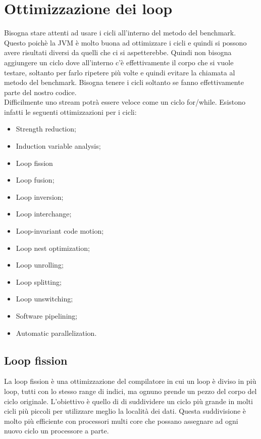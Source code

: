 \documentclass[a4paper, 11pt,            %
openright,               %
italian,
english                 
]{article}       %
\begin{document}
	
	
	











	\section{Ottimizzazione dei loop}
	
	Bisogna stare attenti ad usare i cicli all'interno del metodo del benchmark. Questo poichè la JVM è molto buona ad ottimizzare i cicli e quindi si possono avere risultati diversi da quelli che ci si aspetterebbe. Quindi non bisogna aggiungere un ciclo dove all'interno c'è effettivamente il corpo che si vuole testare, soltanto per farlo ripetere più volte e quindi evitare la chiamata al metodo del benchmark. Bisogna tenere i cicli soltanto se fanno effettivamente parte del nostro codice. \\
	Difficilmente uno stream potrà essere veloce come un ciclo for/while. Esistono infatti le seguenti ottimizzazioni per i cicli:
	\begin{itemize}
		\item Strength reduction;
		\item Induction variable analysis;
		\item Loop fission
		\item Loop fusion;
		\item Loop inversion;
		\item Loop interchange;
		\item Loop-invariant code motion;
		\item Loop nest optimization;
		\item Loop unrolling;
		\item Loop splitting;
		\item Loop unswitching;
		\item Software pipelining;
		\item Automatic parallelization.
	\end{itemize}

	
	\subsection{Loop fission}
	
	La loop fission è una ottimizzazione del compilatore in cui un loop è diviso in più loop, tutti con lo stesso range di indici, ma ognuno prende un pezzo del corpo del ciclo originale. L'obiettivo è quello di di suddividere un ciclo più grande in molti cicli più piccoli per utilizzare meglio la località dei dati. Questa suddivisione è molto più efficiente con processori multi core che possano assegnare ad ogni nuovo ciclo un processore a parte.
	
\end{document}
